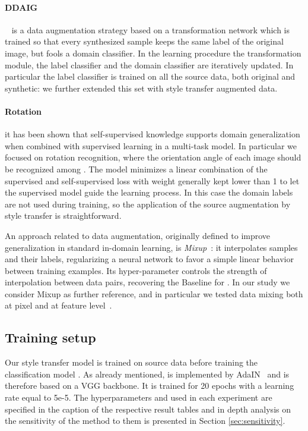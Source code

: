 \paragraph{DDAIG}~\cite{zhou2020deep} is a data augmentation strategy based on a transformation network which is trained so that every synthesized sample keeps the same label of the original image, but fools a domain classifier. In the learning procedure the transformation module, the label classifier and the domain classifier are iteratively updated. In particular the label classifier is trained on all the source data, both original and synthetic: we further extended this set with style transfer augmented data. 
\paragraph{Rotation~\cite{lopez_rotation}} it has been shown that self-supervised knowledge supports domain generalization when combined with supervised learning in a multi-task model. In particular we focused on rotation recognition, where the orientation angle of each image should be recognized among . The model minimizes a linear combination of the supervised and self-supervised loss with weight  generally kept lower than 1 to let the supervised model guide the learning process.
In this case the domain labels are not used during training, so the application of the source augmentation by style transfer is straightforward.

An approach related to data augmentation, originally defined to improve generalization in standard in-domain learning, is \emph{Mixup}~\cite{zhang2018mixup}: it interpolates samples and their labels, regularizing a neural network to favor a simple linear behavior between training examples. Its hyper-parameter  controls the strength of interpolation between data pairs, recovering the Baseline for . In our study we consider Mixup as further reference, and in particular we tested data mixing both at pixel and at feature level~\cite{xu2020adversarial}.

\subsection{Training setup}

Our style transfer model  is trained on source data before training the classification model . As already mentioned,  is implemented by AdaIN~\cite{Huang_2017_ICCV_adain} and is therefore based on a VGG backbone. It is trained for 20 epochs with a learning rate equal to 5e-5. The hyperparameters  and  used in each experiment are specified in the caption of the respective result tables and in depth analysis on the sensitivity of the method to them is presented in Section \ref{sec:sensitivity}.

